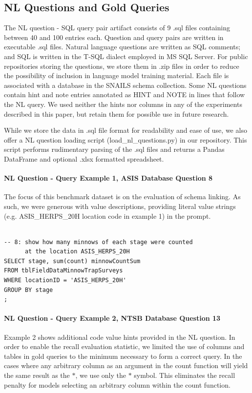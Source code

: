 \subsection{NL Questions and Gold Queries}

The NL question - SQL query pair artifact consists of 9 .sql files containing between 40 and 100 entries each.
Question and query pairs are written in executable .sql files.
Natural language questions are written as SQL comments; and SQL is written in the T-SQL dialect employed in MS SQL Server.
For public repositories storing the questions, we store them in .zip files in order to reduce the possibility of inclusion in language model training material.
Each file is associated with a database in the SNAILS schema collection.
Some NL questions contain hint and note entries annotated as HINT and NOTE in lines that follow the NL query.
We used neither the hints nor columns in any of the experiments described in this paper, but retain them for possible use in future research.

While we store the data in .sql file format for readability and ease of use, we also offer a NL question loading script (load\_nl\_questions.py) in our repository. 
This script performs rudimentary parsing of the .sql files and returns a Pandas DataFrame and optional .xlsx formatted spreadsheet.

\paragraph{NL Question - Query Example 1, ASIS Database Question 8}
The focus of this benchmark dataset is on the evaluation of schema linking.
As such, we were generous with value descriptions, providing literal value strings (e.g. ASIS\_HERPS\_20H location code in example 1) in the prompt.

\begin{verbatim}

-- 8: show how many minnows of each stage were counted 
      at the location ASIS_HERPS_20H
SELECT stage, sum(count) minnowCountSum
FROM tblFieldDataMinnowTrapSurveys
WHERE locationID = 'ASIS_HERPS_20H'
GROUP BY stage
;
\end{verbatim}

\paragraph{NL Question - Query Example 2, NTSB Database Question 13}
Example 2 shows additional code value hints provided in the NL question.
In order to enable the recall evaluation statistic, we limited the use of columns and tables in gold queries to the minimum necessary to form a correct query.
In the cases where any arbitrary column as an argument in the count function will yield the same result as the $\ast$, we use only the $\ast$ symbol. 
This eliminates the recall penalty for models selecting an arbitrary column within the count function.

